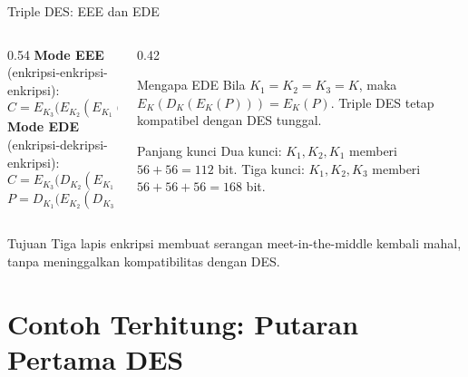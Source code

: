 \documentclass[aspectratio=169,11pt]{beamer}
\begin{document}
\begin{frame}{Triple DES: EEE dan EDE}
    \begin{columns}[T,onlytextwidth]
        \begin{column}{0.54\textwidth}
            \footnotesize
            \textbf{Mode EEE} (enkripsi-enkripsi-enkripsi):
            \[
                C=E_{K_3}\bigl(E_{K_2}(E_{K_1}(P))\bigr)
            \]
            \textbf{Mode EDE} (enkripsi-dekripsi-enkripsi):
            \[
                C=E_{K_3}\bigl(D_{K_2}(E_{K_1}(P))\bigr)
            \]
            \[
                P=D_{K_1}\bigl(E_{K_2}(D_{K_3}(C))\bigr)
            \]
        \end{column}
        \begin{column}{0.42\textwidth}
            \begin{block}{Mengapa EDE}
                \footnotesize
                Bila $K_1=K_2=K_3=K$, maka
                $E_K(D_K(E_K(P)))=E_K(P)$. Triple DES tetap kompatibel
                dengan DES tunggal.
            \end{block}
            \begin{exampleblock}{Panjang kunci}
                \footnotesize
                Dua kunci: $K_1,K_2,K_1$ memberi $56+56=112$ bit.
                Tiga kunci: $K_1,K_2,K_3$ memberi $56+56+56=168$ bit.
            \end{exampleblock}
        \end{column}
    \end{columns}
    \vspace{0.1cm}
    \begin{alertblock}{Tujuan}
        \footnotesize
        Tiga lapis enkripsi membuat serangan meet-in-the-middle kembali
        mahal, tanpa meninggalkan kompatibilitas dengan DES.
    \end{alertblock}
\end{frame}

\section{Contoh Terhitung: Putaran Pertama DES}
\end{document}
